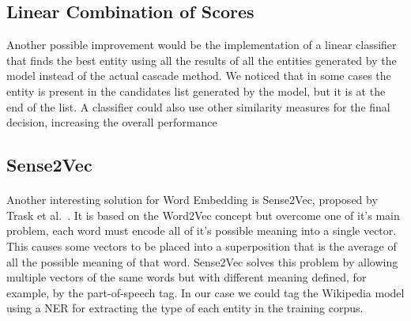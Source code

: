 \subsection{Linear Combination of Scores} 
Another possible improvement would be the implementation of a linear classifier that finds the best entity using all the results of all the entities generated by the model instead of the actual cascade method. We noticed that in some cases the entity is present in the candidates list generated by the model, but it is at the end of the list. A classifier could also use other similarity measures for the final decision, increasing the overall performance

\subsection{Sense2Vec}
\paragraph{}
Another interesting solution for Word Embedding is Sense2Vec, proposed by Trask et al.~\cite{trask2015sense2vec}. It is based on the Word2Vec concept but overcome one of it's main problem, each word must encode all of it's possible meaning into a single vector. This causes some vectors to be placed into a superposition that is the average of all the possible meaning of that word. Sense2Vec solves this problem by allowing multiple vectors of the same words but with different meaning defined, for example, by the part-of-speech tag. In our case we could tag the Wikipedia model using a NER for extracting the type of each entity in the training corpus.

